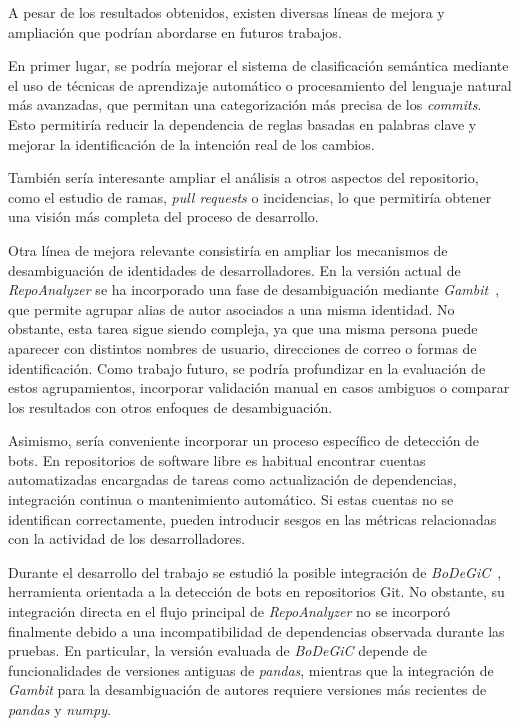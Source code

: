 \documentclass[a4paper, 12pt]{book}
\begin{document}
A pesar de los resultados obtenidos, existen diversas líneas de mejora y ampliación que podrían abordarse en futuros trabajos.

En primer lugar, se podría mejorar el sistema de clasificación semántica mediante el uso de técnicas de aprendizaje automático o procesamiento del lenguaje natural más avanzadas, que permitan una categorización más precisa de los \emph{commits}. Esto permitiría reducir la dependencia de reglas basadas en palabras clave y mejorar la identificación de la intención real de los cambios.

También sería interesante ampliar el análisis a otros aspectos del repositorio, como el estudio de ramas, \emph{pull requests} o incidencias, lo que permitiría obtener una visión más completa del proceso de desarrollo.

Otra línea de mejora relevante consistiría en ampliar los mecanismos de desambiguación de identidades de desarrolladores. En la versión actual de \emph{RepoAnalyzer} se ha incorporado una fase de desambiguación mediante \emph{Gambit}~\cite{gote2021gambit}, que permite agrupar alias de autor asociados a una misma identidad. No obstante, esta tarea sigue siendo compleja, ya que una misma persona puede aparecer con distintos nombres de usuario, direcciones de correo o formas de identificación. Como trabajo futuro, se podría profundizar en la evaluación de estos agrupamientos, incorporar validación manual en casos ambiguos o comparar los resultados con otros enfoques de desambiguación.

Asimismo, sería conveniente incorporar un proceso específico de detección de bots. En repositorios de software libre es habitual encontrar cuentas automatizadas encargadas de tareas como actualización de dependencias, integración continua o mantenimiento automático. Si estas cuentas no se identifican correctamente, pueden introducir sesgos en las métricas relacionadas con la actividad de los desarrolladores.

Durante el desarrollo del trabajo se estudió la posible integración de \emph{BoDeGiC}~\cite{golzadeh2021bodegic}, herramienta orientada a la detección de bots en repositorios Git. No obstante, su integración directa en el flujo principal de \emph{RepoAnalyzer} no se incorporó finalmente debido a una incompatibilidad de dependencias observada durante las pruebas. En particular, la versión evaluada de \emph{BoDeGiC} depende de funcionalidades de versiones antiguas de \emph{pandas}, mientras que la integración de \emph{Gambit} para la desambiguación de autores requiere versiones más recientes de \emph{pandas} y \emph{numpy}.
\end{document}
